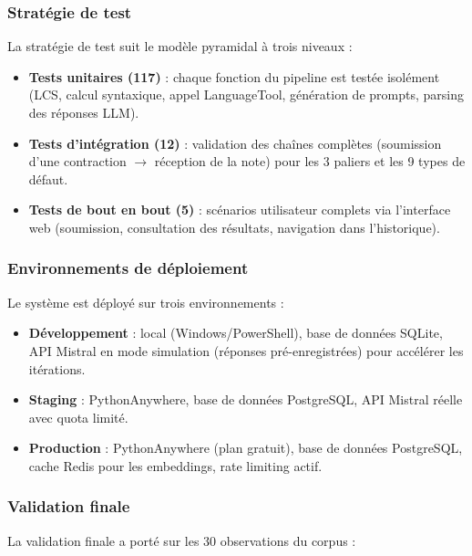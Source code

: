 \subsubsection{Stratégie de test}

La stratégie de test suit le modèle pyramidal à trois niveaux :

\begin{itemize}
    \item \textbf{Tests unitaires (117)} : chaque fonction du pipeline est testée isolément (LCS, calcul syntaxique, appel LanguageTool, génération de prompts, parsing des réponses LLM).
    \item \textbf{Tests d'intégration (12)} : validation des chaînes complètes (soumission d'une contraction $\rightarrow$ réception de la note) pour les 3 paliers et les 9 types de défaut.
    \item \textbf{Tests de bout en bout (5)} : scénarios utilisateur complets via l'interface web (soumission, consultation des résultats, navigation dans l'historique).
\end{itemize}

\subsubsection{Environnements de déploiement}

Le système est déployé sur trois environnements :

\begin{itemize}
    \item \textbf{Développement} : local (Windows/PowerShell), base de données SQLite, API Mistral en mode simulation (réponses pré-enregistrées) pour accélérer les itérations.
    \item \textbf{Staging} : PythonAnywhere, base de données PostgreSQL, API Mistral réelle avec quota limité.
    \item \textbf{Production} : PythonAnywhere (plan gratuit), base de données PostgreSQL, cache Redis pour les embeddings, rate limiting actif.
\end{itemize}

\subsubsection{Validation finale}

La validation finale a porté sur les 30 observations du corpus :

